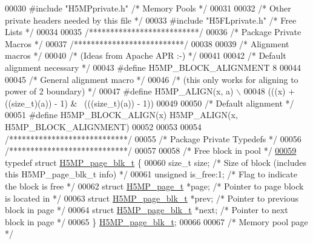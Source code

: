 \begin{DoxyCode}
00030 \textcolor{preprocessor}{#include "H5MPprivate.h"}    \textcolor{comment}{/* Memory Pools             */}
00031 
00032 \textcolor{comment}{/* Other private headers needed by this file */}
00033 \textcolor{preprocessor}{#include "H5FLprivate.h"}    \textcolor{comment}{/* Free Lists                           */}
00034 
00035 \textcolor{comment}{/**************************/}
00036 \textcolor{comment}{/* Package Private Macros */}
00037 \textcolor{comment}{/**************************/}
00038 
00039 \textcolor{comment}{/* Alignment macros */}
00040 \textcolor{comment}{/* (Ideas from Apache APR :-) */}
00041 
00042 \textcolor{comment}{/* Default alignment necessary */}
00043 \textcolor{preprocessor}{#define H5MP\_BLOCK\_ALIGNMENT    8}
00044 
00045 \textcolor{comment}{/* General alignment macro */}
00046 \textcolor{comment}{/* (this only works for aligning to power of 2 boundary) */}
00047 \textcolor{preprocessor}{#define H5MP\_ALIGN(x, a) \(\backslash\)}
00048 \textcolor{preprocessor}{       (((x) + ((size\_t)(a)) - 1) & ~(((size\_t)(a)) - 1))}
00049 
00050 \textcolor{comment}{/* Default alignment */}
00051 \textcolor{preprocessor}{#define H5MP\_BLOCK\_ALIGN(x) H5MP\_ALIGN(x, H5MP\_BLOCK\_ALIGNMENT)}
00052 
00053 
00054 \textcolor{comment}{/****************************/}
00055 \textcolor{comment}{/* Package Private Typedefs */}
00056 \textcolor{comment}{/****************************/}
00057 
00058 \textcolor{comment}{/* Free block in pool */}
\hyperlink{struct_h5_m_p__page__blk__t}{00059} \textcolor{keyword}{typedef} \textcolor{keyword}{struct }\hyperlink{struct_h5_m_p__page__blk__t}{H5MP\_page\_blk\_t} \{
00060     \textcolor{keywordtype}{size\_t} size;                        \textcolor{comment}{/* Size of block (includes this H5MP\_page\_blk\_t info) */}
00061     \textcolor{keywordtype}{unsigned} is\_free:1;                 \textcolor{comment}{/* Flag to indicate the block is free */}
00062     \textcolor{keyword}{struct }\hyperlink{struct_h5_m_p__page__t}{H5MP\_page\_t} *page;           \textcolor{comment}{/* Pointer to page block is located in */}
00063     \textcolor{keyword}{struct }\hyperlink{struct_h5_m_p__page__blk__t}{H5MP\_page\_blk\_t} *prev;       \textcolor{comment}{/* Pointer to previous block in page */}
00064     \textcolor{keyword}{struct }\hyperlink{struct_h5_m_p__page__blk__t}{H5MP\_page\_blk\_t} *next;       \textcolor{comment}{/* Pointer to next block in page */}
00065 \} \hyperlink{struct_h5_m_p__page__blk__t}{H5MP\_page\_blk\_t};
00066 
00067 \textcolor{comment}{/* Memory pool page */}

\end{DoxyCode}
